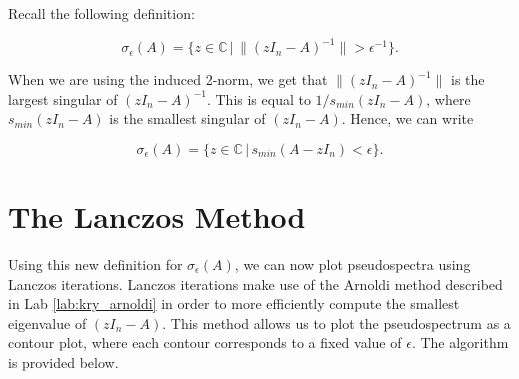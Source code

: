 Recall the following definition:

\begin{equation}
\sigma _{\epsilon}(A) = \{ z \in \mathbb{C} \, | \, \lVert (zI_n-A)^{-1} \rVert > \epsilon ^{-1}\}	.
\end{equation}

When we are using the induced 2-norm, we get that $\lVert (zI_n-A)^{-1} \rVert$ is the largest singular of $(zI_n-A)^{-1}$. This is equal to $1/s_{min}(zI_n-A)$, where $s_{min}(zI_n-A)$ is the smallest singular of $(zI_n-A)$. Hence, we can write

\begin{equation}
\sigma _{\epsilon}(A) = \{ z \in \mathbb{C} \, | \, s_{min}(A-zI_n) < \epsilon \}.	
\end{equation}


\section*{The Lanczos Method}

Using this new definition for $\sigma _{\epsilon}(A)$, we can now plot pseudospectra using Lanczos iterations. Lanczos iterations make use of the Arnoldi method described in Lab \ref{lab:kry_arnoldi} in order to more efficiently compute the smallest eigenvalue of $(zI_n-A)$. This method allows us to plot the pseudospectrum as a contour plot, where each contour corresponds to a fixed value of $\epsilon$. The algorithm is provided below.

